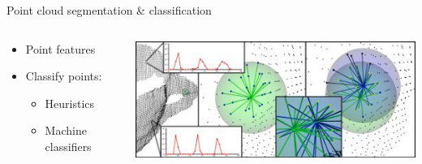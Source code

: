 \documentclass[compress]{beamer}
\begin{document}
\begin{frame}{Point cloud segmentation \& classification}

\begin{columns}[T]
\begin{column}{0.5\textwidth}

\begin{itemize}
\item Point features
\item Classify points:
\begin{itemize}
\item Heuristics
\item Machine classifiers
\end{itemize}
\end{itemize}

\end{column}

\begin{column}{0.5\textwidth}

\includegraphics[width=1\textwidth]{pics/features.png}

\end{column}
\end{columns}
\end{frame}
\end{document}
